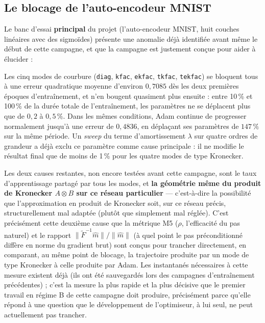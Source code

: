 \documentclass[11pt,a4paper]{article}
\newcommand{\eng}[1]{\emph{#1}}
\begin{document}
\subsection{Le blocage de l'auto-encodeur MNIST}
\label{sec:stall}

Le banc d'essai \textbf{principal} du projet (l'auto-encodeur MNIST, huit couches linéaires avec des
sigmoïdes) présente une anomalie déjà identifiée avant même le début de cette campagne, et que la
campagne est justement conçue pour aider à élucider :

\begin{mesure}
Les cinq modes de courbure (\texttt{diag}, \texttt{kfac}, \texttt{ekfac}, \texttt{tkfac},
\texttt{tekfac}) se bloquent tous à une erreur quadratique moyenne d'environ $0{,}7085$ dès les
deux premières époques d'entraînement, et n'en bougent quasiment plus ensuite : entre 10\,\% et
100\,\% de la durée totale de l'entraînement, les paramètres ne se déplacent plus que de
$0{,}2$ à $0{,}5\,\%$. Dans les mêmes conditions, Adam continue de progresser normalement jusqu'à
une erreur de $0{,}4836$, en déplaçant ses paramètres de $147\,\%$ sur la même période. Un
\eng{sweep} du terme d'amortissement $\lambda$ sur quatre ordres de grandeur a déjà exclu ce
paramètre comme cause principale : il ne modifie le résultat final que de moins de 1\,\% pour les
quatre modes de type Kronecker.
\end{mesure}

Les deux causes restantes, non encore testées avant cette campagne, sont le taux d'apprentissage
partagé par tous les modes, et \textbf{la géométrie même du produit de Kronecker $A\otimes B$ sur ce
réseau particulier} — c'est-à-dire la possibilité que l'approximation en produit de Kronecker soit,
sur ce réseau précis, structurellement mal adaptée (plutôt que simplement mal réglée). C'est
précisément cette deuxième cause que la métrique M5 ($\rho$, l'efficacité du pas naturel) et le
rapport $\|\tilde F^{-1}\hat m\|/\|\hat m\|$ (à quel point le pas préconditionné diffère en norme du
gradient brut) sont conçus pour trancher directement, en comparant, au même point de blocage, la
trajectoire produite par un mode de type Kronecker à celle produite par Adam. Les instantanés
nécessaires à cette mesure existent déjà (ils ont été sauvegardés lors des campagnes
d'entraînement précédentes) ; c'est la mesure la plus rapide et la plus décisive que le premier
travail en régime B de cette campagne doit produire, précisément parce qu'elle répond à une question
que le développement de l'optimiseur, à lui seul, ne peut actuellement pas trancher.
\end{document}
